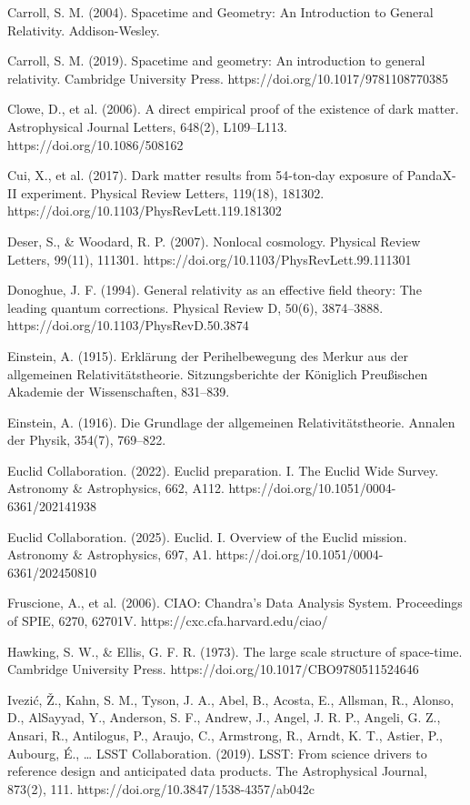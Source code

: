 Carroll, S. M. (2004). Spacetime and Geometry: An Introduction to General Relativity. Addison-Wesley.

Carroll, S. M. (2019). Spacetime and geometry: An introduction to general relativity. Cambridge University Press. https://doi.org/10.1017/9781108770385

Clowe, D., et al. (2006). A direct empirical proof of the existence of dark matter. Astrophysical Journal Letters, 648(2), L109--L113. https://doi.org/10.1086/508162

Cui, X., et al. (2017). Dark matter results from 54-ton-day exposure of PandaX-II experiment. Physical Review Letters, 119(18), 181302. https://doi.org/10.1103/PhysRevLett.119.181302

Deser, S., \& Woodard, R. P. (2007). Nonlocal cosmology. Physical Review Letters, 99(11), 111301. https://doi.org/10.1103/PhysRevLett.99.111301

Donoghue, J. F. (1994). General relativity as an effective field theory: The leading quantum corrections. Physical Review D, 50(6), 3874--3888. https://doi.org/10.1103/PhysRevD.50.3874

Einstein, A. (1915). Erklärung der Perihelbewegung des Merkur aus der allgemeinen Relativitätstheorie. Sitzungsberichte der Königlich Preußischen Akademie der Wissenschaften, 831--839.

Einstein, A. (1916). Die Grundlage der allgemeinen Relativitätstheorie. Annalen der Physik, 354(7), 769--822.

Euclid Collaboration. (2022). Euclid preparation. I. The Euclid Wide Survey. Astronomy \& Astrophysics, 662, A112. https://doi.org/10.1051/0004-6361/202141938

Euclid Collaboration. (2025). Euclid. I. Overview of the Euclid mission. Astronomy \& Astrophysics, 697, A1. https://doi.org/10.1051/0004-6361/202450810

Fruscione, A., et al. (2006). CIAO: Chandra's Data Analysis System. Proceedings of SPIE, 6270, 62701V. https://cxc.cfa.harvard.edu/ciao/

Hawking, S. W., \& Ellis, G. F. R. (1973). The large scale structure of space-time. Cambridge University Press. https://doi.org/10.1017/CBO9780511524646

Ivezić, Ž., Kahn, S. M., Tyson, J. A., Abel, B., Acosta, E., Allsman, R., Alonso, D., AlSayyad, Y., Anderson, S. F., Andrew, J., Angel, J. R. P., Angeli, G. Z., Ansari, R., Antilogus, P., Araujo, C., Armstrong, R., Arndt, K. T., Astier, P., Aubourg, É., \ldots{} LSST Collaboration. (2019). LSST: From science drivers to reference design and anticipated data products. The Astrophysical Journal, 873(2), 111. https://doi.org/10.3847/1538-4357/ab042c

